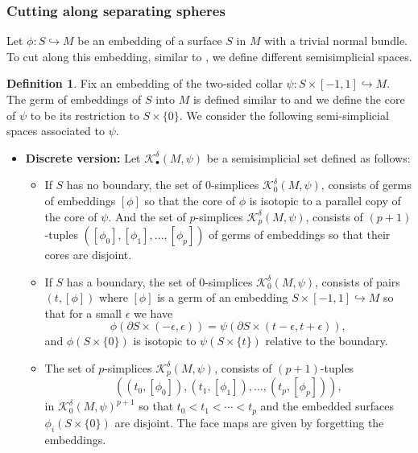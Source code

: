 \documentclass[a4paper]{amsart}
\theoremstyle{definition}
\newtheorem{defn}[thm]{Definition}
\theoremstyle{remark}
\numberwithin{equation}{section}
\begin{document}
\subsubsection{Cutting along  separating spheres} Let $\phi: S\hookrightarrow M$ be an embedding of a surface $S$ in $M$ with a trivial normal bundle. To cut along this embedding, similar to , we define different semisimplicial spaces. 
\begin{defn}\label{surfaces}Fix an embedding of the two-sided collar $\psi:S\times [-1,1]\hookrightarrow M$. The germ of embeddings of $S$ into $M$ is defined similar to  and we define the core of $\psi$ to be its restriction to $S\times \{0\}$. We consider the following semi-simplicial spaces associated to $\psi$.

\begin{itemize}[leftmargin=*]\item {\bf Discrete version:} Let $\mathcal{K}^{\delta}_{\bullet}(M,\psi)$ be a semisimplicial set defined as follows:
\begin{itemize}
\item If $S$ has no boundary,  the set of $0$-simplices $\mathcal{K}^{\delta}_0(M,\psi)$, consists of germs of embeddings $[\phi]$ so that the core of $\phi$ is isotopic to a parallel copy of the core of $\psi$. And the set of  $p$-simplices   $\mathcal{K}^{\delta}_p(M,\psi)$, consists of $(p+1)$-tuples $([\phi_0], [\phi_1],\dots, [\phi_p])$ of germs of embeddings so that their cores are disjoint. 
\item If $S$ has a boundary, the set of $0$-simplices $\mathcal{K}^{\delta}_0(M,\psi)$, consists of pairs $(t,[\phi])$ where $[\phi]$ is a germ of an embedding $S\times [-1,1]\hookrightarrow M$ so that for a small $\epsilon$ we have 
\[
\phi(\partial S\times (-\epsilon,\epsilon))=\psi(\partial S\times(t-\epsilon,t+\epsilon)),
\]
and $\phi(S\times \{0\})$ is isotopic to $\psi(S\times \{t\})$ relative to the boundary. 
\item The set of  $p$-simplices   $\mathcal{K}^{\delta}_p(M,\psi)$, consists of $(p+1)$-tuples $$((t_0,[\phi_0]), (t_1,[\phi_1]),\dots, (t_p, [\phi_p])),$$ in $\mathcal{K}^{\delta}_0(M,\psi)^{p+1}$ so that $t_0<t_1<\cdots<t_p$ and  the embedded surfaces  $\phi_i(S\times \{0\})$ are disjoint. The face maps are given by forgetting the embeddings.


\end{itemize}
\end{itemize}
\end{defn}
\end{document}
